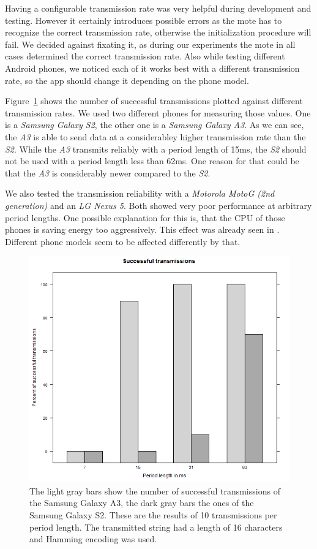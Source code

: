 \documentclass{sig-alternate} %
\begin{document}
Having a configurable transmission rate was very helpful during development and testing.
However it certainly introduces possible errors as the mote has to recognize the correct transmission rate, otherwise the initialization procedure will fail.
We decided against fixating it, as during our experiments the mote in all cases determined the correct transmission rate.
Also while testing different Android phones, we noticed each of it works best with a different transmission rate, so the app should change it depending on the phone model.

Figure~\ref{fig:successful_transmissions} shows the number of successful transmissions plotted against different transmission rates.
We used two different phones for measuring those values.
One is a \textit{Samsung Galaxy S2}, the other one is a \textit{Samsung Galaxy A3}.
As we can see, the \textit{A3} is able to send data at a considerabley higher transmission rate than the \textit{S2}.
While the \textit{A3} transmits reliably with a period length of 15ms, the \textit{S2} should not be used with a period length less than 62ms.
One reason for that could be that the \textit{A3} is considerably newer compared to the \textit{S2}.

We also tested the transmission reliability with a \textit{Motorola MotoG (2nd generation)} and an \textit{LG Nexus 5}.
Both showed very poor performance at arbitrary period lengths.
One possible explanation for this is, that the CPU of those phones is saving energy too aggressively.
This effect was already seen in \cite{mongia2010reliable}.
Different phone models seem to be affected differently by that.

\begin{figure}
	\centering
	\includegraphics[scale=.35]{images/successful-transmissions.png}
	\caption{The light gray bars show the number of successful transmissions of the Samsung Galaxy A3, the dark gray bars the ones of the Samsung Galaxy S2. These are the results of 10 transmissions per period length. The transmitted string had a length of 16 characters and Hamming encoding was used.}
	\label{fig:successful_transmissions}
\end{figure}
\end{document}
